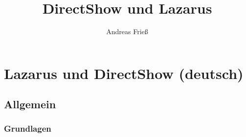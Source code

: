 \documentclass[10pt,
a4paper,
oneside,
titlepage,
bibtotocnumbered,	  %
liststotocnumbered]{scrbook}
\author{Andreas Frieß}
\title{DirectShow und Lazarus}
\begin{document}
\setcounter{tocdepth}{3} %
\pagestyle{empty} %
\maketitle 						%
%	
\tableofcontents			%

\newpage
\pagestyle{headings} %

\part[Lazarus und DirectShow]{Lazarus und DirectShow (deutsch)}
\chapter{Allgemein}
\section{Grundlagen}

\end{document}
